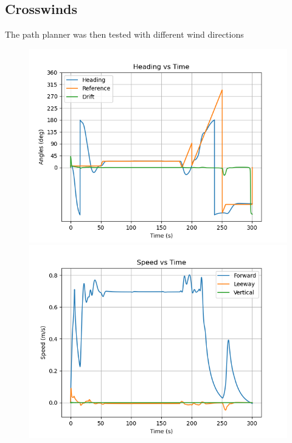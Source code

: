 \documentclass[conference]{IEEEtran}
\begin{document}
\subsection{Crosswinds}
The path planner was then tested with different wind directions
\begin{figure}
    \centering
    \includegraphics[trim={0.5cm 0.25cm 1.25cm 0.75cm },clip]{documents/final_pres_figs/with_wind_to_40_40_heading.png}
    \includegraphics[trim={0.5cm 0.25cm 1.25cm 0.75cm },clip]{documents/final_pres_figs/with_wind_to_40_40_speed.png}

\end{figure}
\end{document}
